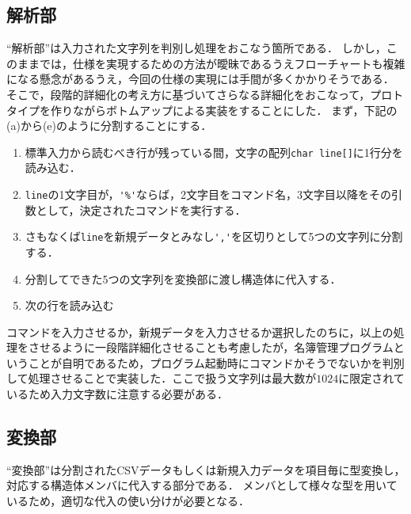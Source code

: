 \documentclass[a4j,11pt]{jarticle}
\begin{document}
\subsection{解析部} \label{sec:parse}

``解析部''は入力された文字列を判別し処理をおこなう箇所である．
しかし，このままでは，仕様を実現するための方法が曖昧であるうえフローチャートも複雑になる懸念があるうえ，今回の仕様の実現には手間が多くかかりそうである．
そこで，段階的詳細化の考え方に基づいてさらなる詳細化をおこなって，プロトタイプを作りながらボトムアップによる実装をすることにした．
まず，下記の(a)から(e)のように分割することにする．

\begin{enumerate}
\setlength{\parskip}{2pt} \setlength{\itemsep}{2pt}
\renewcommand{\labelenumi}{(\alph{enumi})} %
    \item 標準入力から読むべき行が残っている間，文字の配列\verb|char line[]|に1行分を読み込む．
    \item \verb|line|の1文字目が，\verb|'%'|ならば，2文字目をコマンド名，3文字目以降をその引数として，決定されたコマンドを実行する．
    \item さもなくば\verb|line|を新規データとみなし\verb|','|を区切りとして5つの文字列に分割する．
    \item 分割してできた5つの文字列を変換部に渡し構造体に代入する．
    \item 次の行を読み込む
\end{enumerate}
コマンドを入力させるか，新規データを入力させるか選択したのちに，以上の処理をさせるように一段階詳細化させることも考慮したが，名簿管理プログラムということが自明であるため，プログラム起動時にコマンドかそうでないかを判別して処理させることで実装した．ここで扱う文字列は最大数が$1024$に限定されているため入力文字数に注意する必要がある．

\subsection{変換部} \label{sec:exchange}

``変換部''は分割されたCSVデータもしくは新規入力データを項目毎に型変換し，
対応する構造体メンバに代入する部分である．
メンバとして様々な型を用いているため，適切な代入の使い分けが必要となる．
\end{document}
